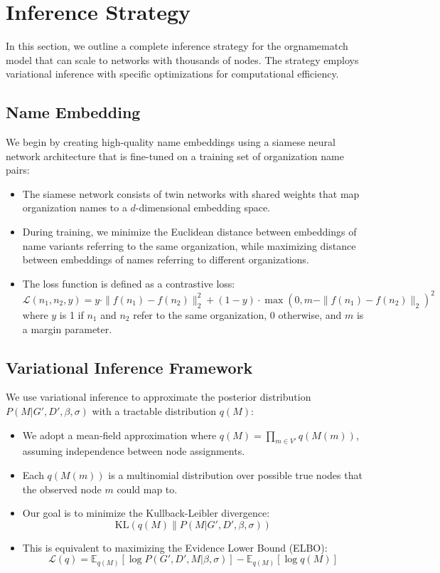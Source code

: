 \documentclass[12pt]{article}
\begin{document}
\section{Inference Strategy}
In this section, we outline a complete inference strategy for the orgnamematch model that can scale to networks with thousands of nodes. The strategy employs variational inference with specific optimizations for computational efficiency.

\subsection{Name Embedding}
We begin by creating high-quality name embeddings using a siamese neural network architecture that is fine-tuned on a training set of organization name pairs:

\begin{itemize}
\item The siamese network consists of twin networks with shared weights that map organization names to a $d$-dimensional embedding space.
\item During training, we minimize the Euclidean distance between embeddings of name variants referring to the same organization, while maximizing distance between embeddings of names referring to different organizations.
\item The loss function is defined as a contrastive loss:
$$\mathcal{L}(n_1, n_2, y) = y \cdot \|f(n_1) - f(n_2)\|_2^2 + (1-y) \cdot \max(0, m - \|f(n_1) - f(n_2)\|_2)^2$$
where $y$ is 1 if $n_1$ and $n_2$ refer to the same organization, 0 otherwise, and $m$ is a margin parameter.
\end{itemize}

\subsection{Variational Inference Framework}
We use variational inference to approximate the posterior distribution $P(M|G', D', \beta, \sigma)$ with a tractable distribution $q(M)$:

\begin{itemize}
\item We adopt a mean-field approximation where $q(M) = \prod_{m \in V'} q(M(m))$, assuming independence between node assignments.
\item Each $q(M(m))$ is a multinomial distribution over possible true nodes that the observed node $m$ could map to.
\item Our goal is to minimize the Kullback-Leibler divergence:
$$\text{KL}(q(M) \| P(M|G', D', \beta, \sigma))$$
\item This is equivalent to maximizing the Evidence Lower Bound (ELBO):
$$\mathcal{L}(q) = \mathbb{E}_{q(M)}[\log P(G', D', M | \beta, \sigma)] - \mathbb{E}_{q(M)}[\log q(M)]$$
\end{itemize}
\end{document}
